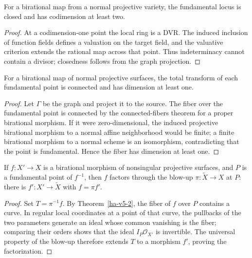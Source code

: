 \begin{lemma}
\label{ha-v5-1}
For a birational map from a normal projective variety, the fundamental locus is
closed and has codimension at least two.

\end{lemma}
\begin{proof}
At a codimension-one point the local ring is a DVR.  The induced inclusion of
function fields defines a valuation on the target field, and the valuative
criterion extends the rational map across that point.  Thus indeterminacy cannot
contain a divisor; closedness follows from the graph projection.
\end{proof}

\begin{theorem}
\label{ha-v5-2}
For a birational map of normal projective surfaces, the total transform of each
fundamental point is connected and has dimension at least one.

\end{theorem}
\begin{proof}
Let \(\Gamma\) be the graph and project it to the source.  The fiber over the
fundamental point is connected by the connected-fibers theorem for a proper
birational morphism.  If it were zero-dimensional, the induced projective
birational morphism to a normal affine neighborhood would be finite; a finite
birational morphism to a normal scheme is an isomorphism, contradicting that the
point is fundamental.  Hence the fiber has dimension at least one.
\end{proof}

\begin{proposition}
\label{ha-v5-3}
If \(f:X'\to X\) is a birational morphism of nonsingular projective surfaces,
and \(P\) is a fundamental point of \(f^{-1}\), then \(f\) factors through the
blow-up \(\pi:\widetilde X\to X\) at \(P\): there is \(f':X'\to\widetilde X\)
with \(f=\pi f'\).
\end{proposition}
\begin{proof}
Set \(T=\pi^{-1}f\).  By Theorem~\ref{ha-v5-2}, the fiber of \(f\) over \(P\)
contains a curve.  In regular local coordinates at a point of that curve, the
pullbacks of the two parameters generate an ideal whose common vanishing is the
fiber; comparing their orders shows that the ideal \(I_P\mathcal O_{X'}\) is
invertible.  The universal property of the blow-up therefore extends \(T\) to
a morphism \(f'\), proving the factorization.
\end{proof}

